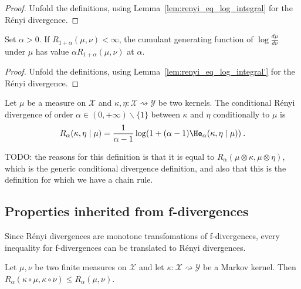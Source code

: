 \begin{proof}%
{}
Unfold the definitions, using Lemma~\ref{lem:renyi_eq_log_integral} for the Rényi divergence.
\end{proof}


\begin{lemma}
  \label{lem:renyi_cgf_2}
  Set $\alpha > 0$. If $R_{1+\alpha}(\mu, \nu) < \infty$, the cumulant generating function of $\log\frac{d\mu}{d\nu}$ under $\mu$ has value $\alpha R_{1+\alpha}(\mu, \nu)$ at $\alpha$.
\end{lemma}

\begin{proof}%
{}
Unfold the definitions, using Lemma~\ref{lem:renyi_eq_log_integral'} for the Rényi divergence.
\end{proof}


\begin{definition}
  \label{def:condRenyi}
  \leanok
  Let $\mu$ be a measure on $\mathcal X$ and $\kappa, \eta : \mathcal X \rightsquigarrow \mathcal Y$ be two kernels. The conditional Rényi divergence of order $\alpha \in (0,+\infty) \backslash \{1\}$ between $\kappa$ and $\eta$ conditionally to $\mu$ is
  \begin{align*}
  R_\alpha(\kappa, \eta \mid \mu) =\frac{1}{\alpha - 1} \log (1 + (\alpha - 1) \He_\alpha(\kappa, \eta \mid \mu)) \: .
  \end{align*}
\end{definition}

TODO: the reasons for this definition is that it is equal to $R_\alpha(\mu \otimes \kappa, \mu \otimes \eta)$, which is the generic conditional divergence definition, and also that this is the definition for which we have a chain rule.




\subsection{Properties inherited from f-divergences}

Since Rényi divergences are monotone transfomations of f-divergences, every inequality for f-divergences can be translated to Rényi divergences.

\begin{theorem}
  \label{thm:renyi_data_proc}
  \leanok
  Let $\mu, \nu$ be two finite measures on $\mathcal X$ and let $\kappa : \mathcal X \rightsquigarrow \mathcal Y$ be a Markov kernel.
  Then $R_\alpha(\kappa \circ \mu, \kappa \circ \nu) \le R_\alpha(\mu, \nu)$.
\end{theorem}

